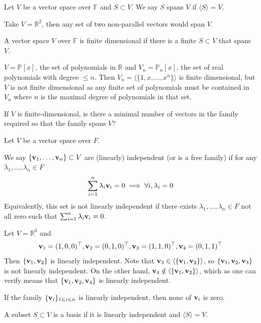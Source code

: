 \documentclass[a4paper]{article}
\begin{document}
\begin{definition}
    Let $V$ be a vector space over $\mathbb F$ and $S\subset V$.
    We say $S$ spans $V$ if $\langle S\rangle =V$.
\end{definition}
\begin{example}
    Take $V=\mathbb R^2$, then any set of two non-parallel vectors would span $V$.
\end{example}
\begin{definition}
    A vector space $V$ over $\mathbb F$ is finite dimensional if there is a finite $S\subset V$ that spans $V$.
\end{definition}
\begin{example}
    $V=\mathbb P[x]$, the set of polynomials in $\mathbb R$ and $V_n=\mathbb P_n[x]$, the set of real polynomials with degree $\le n$.
    Then $V_n=\langle\{1,x,\ldots,x^n\}\rangle$ is finite dimensional, but $V$ is not finite dimensional as any finite set of polynomials must be contained in $V_n$ where $n$ is the maximal degree of polynomials in that set.
\end{example}
If $V$ is finite-dimensional, is there a minimal number of vectors in the family required so that the family spans $V$?
\begin{definition}
    Let $V$ be a vector space over $F$.

    We say $\{{\bf v}_1,\ldots,{\bf v}_n\}\subset V$ are (linearly) independent (or is a free family) if for any $\lambda_1,\ldots,\lambda_n\in F$
    $$\sum_{i=1}^n\lambda_i{\bf v}_i=0\implies\forall i,\lambda_i=0$$
    Equivalently, this set is not linearly independent if there exists $\lambda_1,\ldots,\lambda_n\in F$ not all zero such that $\sum_{i=1}^n\lambda_i{\bf v}_i=0$.
\end{definition}
\begin{example}
Let $V=\mathbb R^3$ and
$${\bf v}_1=(1,0,0)^\top,{\bf v}_2=(0,1,0)^\top,{\bf v}_3=(1,1,0)^\top,{\bf v}_4=(0,1,1)^\top$$
Then $\{{\bf v}_1,{\bf v}_2\}$ is linearly independent.
Note that ${\bf v}_3\in\langle\{{\bf v}_1,{\bf v}_2\}\rangle$, so $\{{\bf v}_1,{\bf v}_2,{\bf v}_3\}$ is not linearly independent.
On the other hand, ${\bf v}_4\notin\langle\{{\bf v}_1,{\bf v}_2\}\rangle$, which as one can verify means that $\{{\bf v}_1,{\bf v}_2,{\bf v}_4\}$ is linearly independent.
\end{example}
\begin{remark}
    If the family $\{{\bf v}_i\}_{1\leqslant i\leqslant n}$ is linearly independent, then none of ${\bf v}_i$ is zero.
\end{remark}
\begin{definition}[Basis]
    A subset $S\subset V$ is a basis if it is linearly independent and $\langle S\rangle=V$.
\end{definition}
\end{document}
